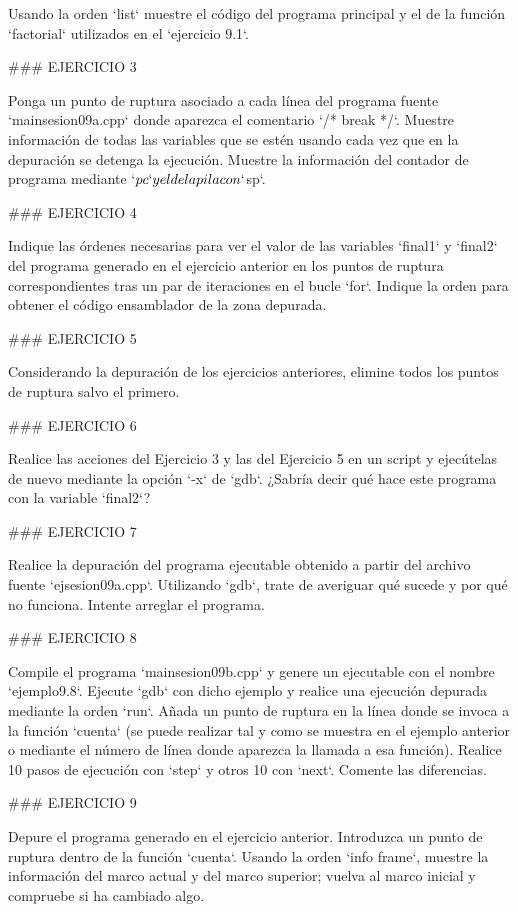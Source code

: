 Usando la orden `list` muestre el código del programa principal y el de la función `factorial` utilizados en el `ejercicio 9.1`.

### EJERCICIO 3

Ponga un punto de ruptura asociado a cada línea del programa fuente `mainsesion09a.cpp` donde aparezca el comentario `/* break */`. Muestre información de todas las variables que se estén usando cada vez que en la depuración se detenga la ejecución. Muestre la información del contador de programa mediante `$pc` y el de la pila con `$sp`.

### EJERCICIO 4

Indique las órdenes necesarias para ver el valor de las variables `final1` y `final2` del programa generado en el ejercicio anterior en los puntos de ruptura correspondientes tras un par de iteraciones en el bucle `for`. Indique la orden para obtener el código ensamblador de la zona depurada.

### EJERCICIO 5

Considerando la depuración de los ejercicios anteriores, elimine todos los puntos de ruptura salvo el primero.

### EJERCICIO 6

Realice las acciones del Ejercicio 3 y las del Ejercicio 5 en un script y ejecútelas de nuevo mediante la opción `-x` de `gdb`. ¿Sabría decir qué hace este programa con la variable `final2`?

### EJERCICIO 7

Realice la depuración del programa ejecutable obtenido a partir del archivo fuente `ejsesion09a.cpp`. Utilizando `gdb`, trate de averiguar qué sucede y por qué no funciona. Intente arreglar el programa.

### EJERCICIO 8

Compile el programa `mainsesion09b.cpp` y genere un ejecutable con el nombre `ejemplo9.8`. Ejecute `gdb` con dicho ejemplo y realice una ejecución depurada mediante la orden `run`. Añada un punto de ruptura en la línea donde se invoca a la función `cuenta` (se puede realizar tal y como se muestra en el ejemplo anterior o mediante el número de línea donde aparezca la llamada a esa función). Realice 10 pasos de ejecución con `step` y otros 10 con `next`. Comente las diferencias.

### EJERCICIO 9

Depure el programa generado en el ejercicio anterior. Introduzca un punto de ruptura dentro de la función `cuenta`. Usando la orden `info frame`, muestre la información del marco actual y del marco superior; vuelva al marco inicial y compruebe si ha cambiado algo.

